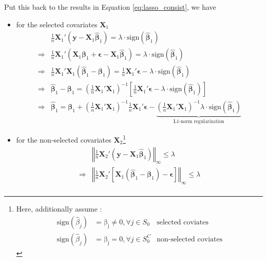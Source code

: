 \documentclass[twoside]{article}
\begin{document}
Put this back to the results in Equation \ref{eq:lasso_consist}, we have
\begin{itemize}
    \item for the selected covariates $\mathbf{X}_1$ 
    \begin{align*}
        &\frac{1}{n}\mathbf{X}_1'\left(\mathbf{y}-\mathbf{X}_1\hat{\boldsymbol{\beta}}_1\right) = \lambda \cdot \mathrm{sign}(\hat{\boldsymbol{\beta}}_1)\\
        \Rightarrow & \frac{1}{n}\mathbf{X}_1'\left(\mathbf{X}_1\boldsymbol{\beta}_1+\boldsymbol{\epsilon}-\mathbf{X}_1\hat{\boldsymbol{\beta}}_1\right) = \lambda \cdot \mathrm{sign}(\hat{\boldsymbol{\beta}}_1)\\
        \Rightarrow & \frac{1}{n}\mathbf{X}_1' \mathbf{X}_1 \left( \hat{\boldsymbol{\beta}}_1- \boldsymbol{\beta}_1\right) = \frac{1}{n}\mathbf{X}_1'\boldsymbol{\epsilon}- \lambda \cdot \mathrm{sign}(\hat{\boldsymbol{\beta}}_1) \\
        \Rightarrow & \hat{\boldsymbol{\beta}}_1- \boldsymbol{\beta}_1 = \left( \frac{1}{n}\mathbf{X}_1' \mathbf{X}_1 \right)^{-1} \left[ \frac{1}{n}\mathbf{X}_1'\boldsymbol{\epsilon}- \lambda \cdot \mathrm{sign}(\hat{\boldsymbol{\beta}}_1) \right] \\
        \Rightarrow & \hat{\boldsymbol{\beta}}_1 = \boldsymbol{\beta}_1 + \left( \frac{1}{n}\mathbf{X}_1' \mathbf{X}_1 \right)^{-1} \frac{1}{n}\mathbf{X}_1'\boldsymbol{\epsilon} -  \underbrace{\left( \frac{1}{n}\mathbf{X}_1' \mathbf{X}_1 \right)^{-1} \lambda \cdot \mathrm{sign}(\hat{\boldsymbol{\beta}}_1)}_{\text{L1-norm regularization}}
    \end{align*}
    \item for the non-selected covariates $\mathbf{X}_2$\footnote{Here, additionally assume : \begin{align*} \mathrm{sign}(\hat{\beta}_j)&=\mathrm{\beta_j}\neq 0, \forall j\in S_0 &\text{selected coviates} \\ \mathrm{sign}(\hat{\beta}_j)&=\mathrm{\beta_j}= 0, \forall j\in S_0^C &\text{non-selected coviates} \end{align*} }
    \begin{align*}
        & \left\Vert \frac{1}{n}\mathbf{X}_2'\left(\mathbf{y}-\mathbf{X}_1\hat{\boldsymbol{\beta}}_1\right) \right\Vert _{\infty} \leq \lambda \\
        \Rightarrow & \left\Vert \frac{1}{n}\mathbf{X}_2'\left[ \mathbf{X}_1 \left(\hat{\boldsymbol{\beta}}_1- \boldsymbol{\beta}_1\right) -\boldsymbol{\epsilon} \right] \right\Vert _{\infty} \leq \lambda \\

\end{align*}
\end{itemize}
\end{document}
